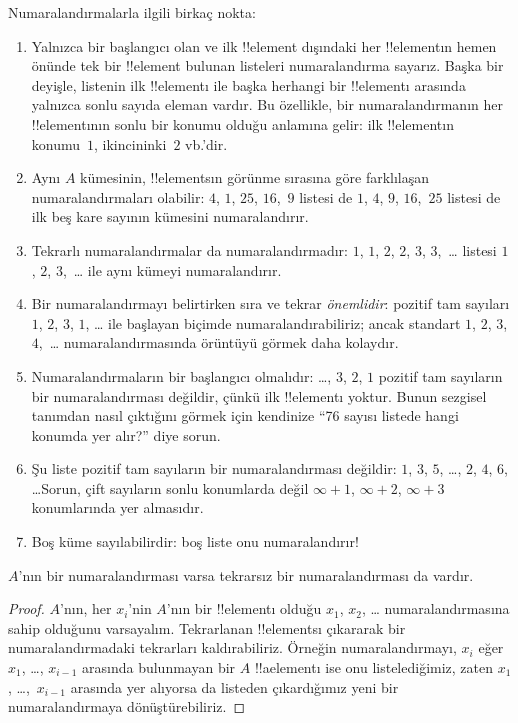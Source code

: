 \begin{explain}
Numaralandırmalarla ilgili birkaç nokta:
\begin{enumerate}
\item Yalnızca bir başlangıcı olan ve ilk !!{element} dışındaki her
  !!{element}{}ın hemen önünde tek bir !!{element} bulunan listeleri
  numaralandırma sayarız. Başka bir deyişle, listenin ilk !!{element}{}ı ile
  başka herhangi bir !!{element}{}ı arasında yalnızca sonlu sayıda eleman
  vardır. Bu özellikle, bir numaralandırmanın her !!{element}{}ının sonlu bir
  konumu olduğu anlamına gelir: ilk !!{element}{}ın konumu~$1$, ikincininki~$2$
  vb.'dir.
\item Aynı $A$ kümesinin, !!{element}s{}ın görünme sırasına göre farklılaşan
  numaralandırmaları olabilir: $4$, $1$, $25$, $16$,~$9$ listesi de $1$,
  $4$, $9$, $16$,~$25$ listesi de ilk beş kare sayının kümesini numaralandırır.
\item Tekrarlı numaralandırmalar da numaralandırmadır: $1$, $1$, $2$, $2$,
  $3$, $3$,~\dots{} listesi $1$, $2$, $3$,~\dots{} ile aynı kümeyi
  numaralandırır.
\item Bir numaralandırmayı belirtirken sıra ve tekrar \emph{önemlidir}:
  pozitif tam sayıları $1$, $2$, $3$, $1$, \dots{} ile başlayan biçimde
  numaralandırabiliriz; ancak standart $1$, $2$, $3$, $4$,~\dots{}
  numaralandırmasında örüntüyü görmek daha kolaydır.
\item Numaralandırmaların bir başlangıcı olmalıdır: \dots, $3$, $2$, $1$
  pozitif tam sayıların bir numaralandırması değildir, çünkü ilk
  !!{element}{}ı yoktur. Bunun sezgisel tanımdan nasıl çıktığını görmek için
  kendinize ``76 sayısı listede hangi konumda yer alır?'' diye sorun.
\item Şu liste pozitif tam sayıların bir numaralandırması değildir: $1$, $3$,
  $5$, \dots, $2$, $4$, $6$, \dots\@ Sorun, çift sayıların sonlu konumlarda
  değil $\infty + 1$, $\infty + 2$, $\infty + 3$ konumlarında yer almasıdır.
\item Boş küme sayılabilirdir: boş liste onu numaralandırır!{}
\end{enumerate}
\end{explain}

\begin{prop}
  $A$'nın bir numaralandırması varsa tekrarsız bir numaralandırması da vardır.
\end{prop}

\begin{proof}
  $A$'nın, her $x_i$'nin $A$'nın bir !!{element}{}ı olduğu $x_1$, $x_2$,
  \dots{} numaralandırmasına sahip olduğunu varsayalım. Tekrarlanan
  !!{element}s{}ı çıkararak bir numaralandırmadaki tekrarları kaldırabiliriz.
  Örneğin numaralandırmayı, $x_i$ eğer $x_1$, \dots, $x_{i-1}$ arasında
  bulunmayan bir $A$ !!a{element}{}ı ise onu listelediğimiz, zaten $x_1$,
  \dots,~$x_{i-1}$ arasında yer alıyorsa da listeden çıkardığımız yeni bir
  numaralandırmaya dönüştürebiliriz.
\end{proof}

